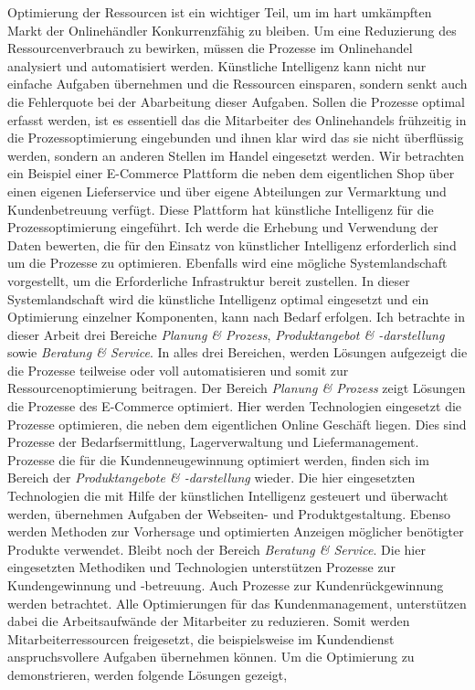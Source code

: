 Optimierung der Ressourcen ist ein wichtiger Teil, um im hart umkämpften Markt der Onlinehändler Konkurrenzfähig zu bleiben. Um eine Reduzierung des Ressourcenverbrauch zu bewirken, müssen die Prozesse im Onlinehandel analysiert und automatisiert werden. Künstliche Intelligenz kann nicht nur einfache Aufgaben übernehmen und die Ressourcen einsparen, sondern senkt auch die Fehlerquote bei der Abarbeitung dieser Aufgaben.
Sollen die Prozesse optimal erfasst werden, ist es essentiell das die Mitarbeiter des Onlinehandels frühzeitig in die Prozessoptimierung eingebunden und ihnen klar wird das sie nicht überflüssig werden, sondern an anderen Stellen im Handel eingesetzt werden. Wir betrachten ein Beispiel einer E-Commerce Plattform die neben dem eigentlichen Shop über einen eigenen Lieferservice und über eigene Abteilungen zur Vermarktung und Kundenbetreuung verfügt. Diese Plattform hat künstliche Intelligenz für die Prozessoptimierung eingeführt.
Ich werde die Erhebung und Verwendung der Daten bewerten, die für den Einsatz von künstlicher Intelligenz erforderlich sind um die Prozesse zu optimieren. Ebenfalls wird eine mögliche Systemlandschaft vorgestellt, um die Erforderliche Infrastruktur bereit zustellen. In dieser Systemlandschaft wird die künstliche Intelligenz optimal eingesetzt und ein Optimierung einzelner Komponenten, kann nach Bedarf erfolgen.
Ich betrachte in dieser Arbeit drei Bereiche \textit{Planung \& Prozess}, \textit{Produktangebot \& -darstellung} sowie \textit{Beratung \& Service}. In alles drei Bereichen, werden Lösungen aufgezeigt die die Prozesse teilweise oder voll automatisieren und somit zur Ressourcenoptimierung beitragen. Der Bereich \textit{Planung \& Prozess} zeigt Lösungen die Prozesse des E-Commerce optimiert. Hier werden Technologien eingesetzt die Prozesse optimieren, die neben dem eigentlichen Online Geschäft liegen. Dies sind Prozesse der Bedarfsermittlung, Lagerverwaltung und Liefermanagement. Prozesse die für die Kundenneugewinnung optimiert werden, finden sich im Bereich der \textit{Produktangebote \& -darstellung} wieder. Die hier eingesetzten Technologien die mit Hilfe der künstlichen Intelligenz gesteuert und überwacht werden, übernehmen Aufgaben der Webseiten- und Produktgestaltung. Ebenso werden Methoden zur Vorhersage und optimierten Anzeigen möglicher benötigter Produkte verwendet. Bleibt noch der Bereich \textit{Beratung \& Service}. Die hier eingesetzten Methodiken und Technologien unterstützen Prozesse zur Kundengewinnung und -betreuung. Auch Prozesse zur Kundenrückgewinnung werden betrachtet. Alle Optimierungen für das Kundenmanagement, unterstützen dabei die Arbeitsaufwände der Mitarbeiter zu reduzieren. Somit werden Mitarbeiterressourcen freigesetzt, die beispielsweise im Kundendienst anspruchsvollere Aufgaben übernehmen können.
Um die Optimierung zu demonstrieren, werden folgende Lösungen gezeigt,

